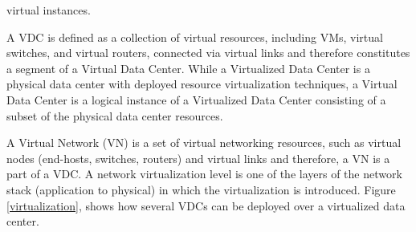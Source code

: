 \noindent virtual instances. 

A VDC is defined as a collection of virtual resources, including VMs, virtual switches, and virtual routers, connected via virtual links and therefore constitutes a segment of a Virtual Data Center. While a Virtualized Data Center is a physical data center with deployed resource virtualization techniques, a Virtual Data Center is a logical instance of a Virtualized Data Center consisting of a subset of the physical data center resources. 

A Virtual Network (VN) is a set of virtual networking resources, such as virtual nodes (end-hosts, switches, routers) and virtual links and therefore, a VN is a part of a VDC. A network virtualization level is one of the layers of the network stack (application to physical) in which the virtualization is introduced. Figure \ref{virtualization}, shows how several VDCs can be deployed over a virtualized data center. 
